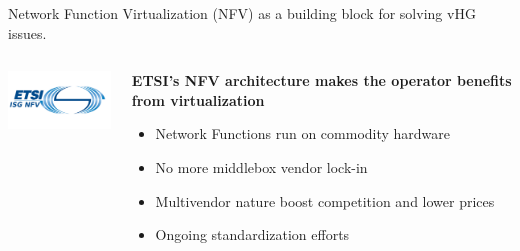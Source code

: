 \documentclass[a4paper]{beamer}
\begin{document}
\begin{frame}{Network Function Virtualization (NFV) as a building block for solving vHG issues.}
		\begin{columns}[T]
		\begin{column}[T]{0.33 \textwidth} 
										\vspace{5em}
			\includegraphics[width=10em]{etsinfv.png}
		\end{column}
						
		\begin{column}[T]{0.66\textwidth} 
				   
					\textbf{ETSI's NFV architecture makes the operator benefits from virtualization}
					\begin{itemize}
						\item Network Functions run on commodity hardware
						\item No more middlebox vendor lock-in
						\item Multivendor nature boost competition and lower prices
						\item Ongoing standardization efforts
					\end{itemize}
			\vspace{3mm}
																																
		\end{column}
																						
	\end{columns}
\end{frame}
\end{document}
